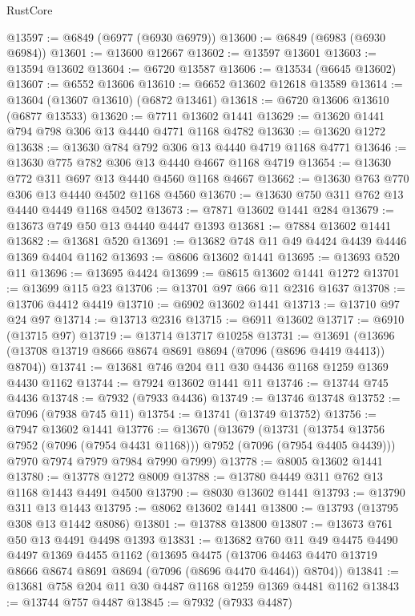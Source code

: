 \begin{lexlean}{RustCore}
\begin{coremodule}
@13597 := @6849 (@6977 (@6930 @6979))
@13600 := @6849 (@6983 (@6930 @6984))
@13601 := @13600 @12667
@13602 := @13597 @13601
@13603 := @13594 @13602
@13604 := @6720 @13587
@13606 := @13534 (@6645 @13602)
@13607 := @6552 @13606
@13610 := @6652 @13602 @12618 @13589
@13614 := @13604 (@13607 @13610) (@6872 @13461)
@13618 := @6720 @13606 @13610 (@6877 @13533)
@13620 := @7711 @13602 @1441
@13629 := @13620 @1441 @794 @798 @306 @13 @4440 @4771 @1168 @4782
@13630 := @13620 @1272
@13638 := @13630 @784 @792 @306 @13 @4440 @4719 @1168 @4771
@13646 := @13630 @775 @782 @306 @13 @4440 @4667 @1168 @4719
@13654 := @13630 @772 @311 @697 @13 @4440 @4560 @1168 @4667
@13662 := @13630 @763 @770 @306 @13 @4440 @4502 @1168 @4560
@13670 := @13630 @750 @311 @762 @13 @4440 @4449 @1168 @4502
@13673 := @7871 @13602 @1441 @284
@13679 := @13673 @749 @50 @13 @4440 @4447 @1393
@13681 := @7884 @13602 @1441
@13682 := @13681 @520
@13691 := @13682 @748 @11 @49 @4424 @4439 @4446 @1369 @4404 @1162
@13693 := @8606 @13602 @1441
@13695 := @13693 @520 @11
@13696 := @13695 @4424
@13699 := @8615 @13602 @1441 @1272
@13701 := @13699 @115 @23
@13706 := @13701 @97 @66 @11 @2316 @1637
@13708 := @13706 @4412 @4419
@13710 := @6902 @13602 @1441
@13713 := @13710 @97 @24 @97
@13714 := @13713 @2316
@13715 := @6911 @13602
@13717 := @6910 (@13715 @97)
@13719 := @13714 @13717 @10258
@13731 := @13691 (@13696 (@13708 @13719 @8666 @8674 @8691 @8694 (@7096 (@8696 @4419 @4413)) @8704))
@13741 := @13681 @746 @204 @11 @30 @4436 @1168 @1259 @1369 @4430 @1162
@13744 := @7924 @13602 @1441 @11
@13746 := @13744 @745 @4436
@13748 := @7932 (@7933 @4436)
@13749 := @13746 @13748
@13752 := @7096 (@7938 @745 @11)
@13754 := @13741 (@13749 @13752)
@13756 := @7947 @13602 @1441
@13776 := @13670
    (@13679
      (@13731 (@13754 @13756 @7952 (@7096 (@7954 @4431 @1168))) @7952 (@7096 (@7954 @4405 @4439)))
      @7970
      @7974
      @7979
      @7984
      @7990
      @7999)
@13778 := @8005 @13602 @1441
@13780 := @13778 @1272 @8009
@13788 := @13780 @4449 @311 @762 @13 @1168 @1443 @4491 @4500
@13790 := @8030 @13602 @1441
@13793 := @13790 @311 @13 @1443
@13795 := @8062 @13602 @1441
@13800 := @13793 (@13795 @308 @13 @1442 @8086)
@13801 := @13788 @13800
@13807 := @13673 @761 @50 @13 @4491 @4498 @1393
@13831 := @13682
    @760
    @11
    @49
    @4475
    @4490
    @4497
    @1369
    @4455
    @1162
    (@13695
      @4475
      (@13706 @4463 @4470 @13719 @8666 @8674 @8691 @8694 (@7096 (@8696 @4470 @4464)) @8704))
@13841 := @13681 @758 @204 @11 @30 @4487 @1168 @1259 @1369 @4481 @1162
@13843 := @13744 @757 @4487
@13845 := @7932 (@7933 @4487)

\end{coremodule}
\end{lexlean}
